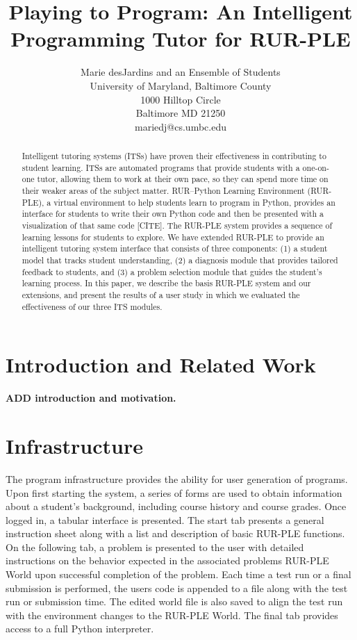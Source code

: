 \documentclass[twocolumn]{article}
\title{Playing to Program:  An Intelligent Programming Tutor for RUR-PLE}
\author{Marie desJardins and an Ensemble of Students \\
University of Maryland, Baltimore County \\ 
1000 Hilltop Circle \\
Baltimore MD  21250 \\
mariedj@cs.umbc.edu
}
\newcommand{\fix}[1]{{\bf #1}}
\begin{document}
\maketitle

\begin{abstract}
Intelligent tutoring systems (ITSs) have proven their effectiveness in
contributing to student learning.  ITSs are automated programs
that provide students with a one-on-one tutor, allowing them to work
at their own pace, so they can spend more time on their weaker areas
of the subject matter.  RUR--Python Learning Environment (RUR-PLE), a
virtual environment to help 
students learn to program in Python, provides an interface for
students to write their own Python code and then be presented with a
visualization of that same code [CITE].  
The RUR-PLE system provides a sequence of learning lessons for
students to explore.  We have extended RUR-PLE to provide an
intelligent tutoring system interface that consists of three
components: 
 (1) a student model that tracks student understanding, 
(2) a diagnosis module
that provides tailored feedback to students, and 
(3) a problem selection
module that guides the student's learning process.  In this paper, we
describe the basis RUR-PLE system and our extensions, and present the
results of a user study in which we evaluated the effectiveness of our
three ITS modules.
\end{abstract}

\section{Introduction and Related Work}
\label{sec:intro}

\fix{ADD introduction and motivation.}

\section{Infrastructure}
\label{sec:student-model}

The program infrastructure provides the ability for user generation of programs. Upon first starting the system, a series of forms are used to obtain information about a student's background, including course history and course grades. Once logged in, a tabular interface is presented. The start tab presents a general instruction sheet along with a list and description of basic RUR-PLE functions. On the following tab, a problem is presented to the user with detailed instructions on the behavior expected in the associated problems RUR-PLE World upon successful completion of the problem. Each time a test run or a final submission is performed, the users code is appended to a file along with the test run or submission time. The edited world file is also saved to align the test run with the environment changes to the RUR-PLE World. The final tab provides access to a full Python interpreter.
\end{document}
